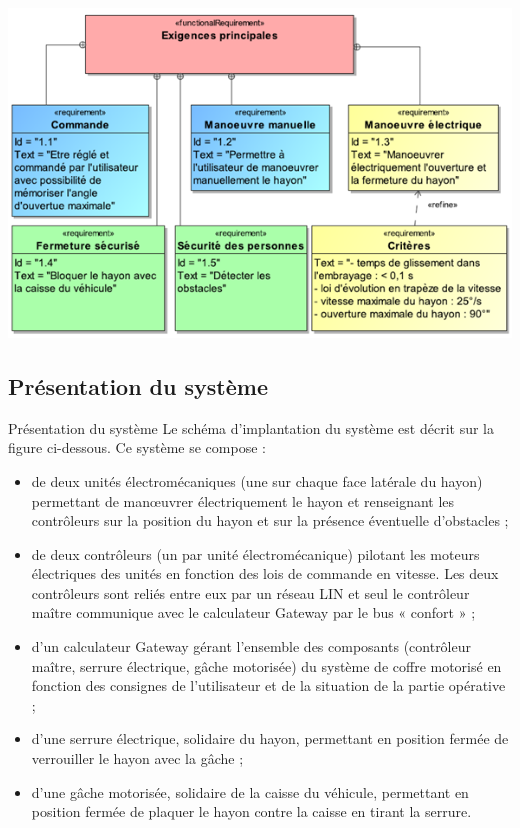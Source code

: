 \documentclass[10pt,fleqn]{article} %
\begin{document}
\begin{multicols}{2}
\begin{multicols}{2}
\begin{center}
\includegraphics[width=.9\linewidth]{images/fig_03.png}
\end{center}

\subsection*{Présentation du système}
Présentation du système
Le schéma d’implantation du système est décrit sur la figure ci-dessous. Ce système se compose :
\begin{itemize}
\item de deux unités électromécaniques (une sur chaque face latérale du hayon) permettant de man\oe{}uvrer électriquement le hayon et renseignant les contrôleurs sur la position du hayon et sur la présence éventuelle d’obstacles ;
\item de deux contrôleurs (un par unité électromécanique) pilotant les moteurs électriques des unités en fonction des lois de commande en vitesse. Les deux contrôleurs sont reliés entre eux par un réseau LIN et seul le contrôleur maître communique avec le calculateur Gateway par le bus « confort » ;
\item d’un calculateur Gateway gérant l’ensemble des composants (contrôleur maître, serrure électrique, gâche motorisée) du système de coffre motorisé en fonction des consignes de l’utilisateur et de la situation de la partie opérative ;
\item d’une serrure électrique, solidaire du hayon, permettant en position fermée de verrouiller le hayon avec la gâche ;
\item d’une gâche motorisée, solidaire de la caisse du véhicule, permettant en position fermée de plaquer le hayon contre la caisse en tirant la serrure.
\end{itemize}



\end{multicols}
\end{multicols}
\end{document}
